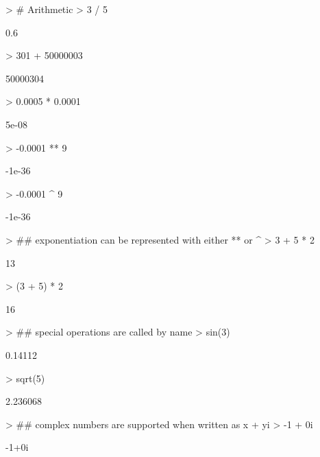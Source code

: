 \documentclass[10pt,letterpaper]{article}
\newenvironment{Schunk}{}{}
\begin{document}
\begin{Schunk}
\begin{Sinput}
> # Arithmetic
> 3 / 5
\end{Sinput}
\begin{Soutput}
[1] 0.6
\end{Soutput}
\begin{Sinput}
> 301 + 50000003
\end{Sinput}
\begin{Soutput}
[1] 50000304
\end{Soutput}
\begin{Sinput}
> 0.0005 * 0.0001
\end{Sinput}
\begin{Soutput}
[1] 5e-08
\end{Soutput}
\begin{Sinput}
> -0.0001 ** 9
\end{Sinput}
\begin{Soutput}
[1] -1e-36
\end{Soutput}
\begin{Sinput}
> -0.0001 ^ 9
\end{Sinput}
\begin{Soutput}
[1] -1e-36
\end{Soutput}
\begin{Sinput}
> ## exponentiation can be represented with either ** or ^
> 3 + 5 * 2
\end{Sinput}
\begin{Soutput}
[1] 13
\end{Soutput}
\begin{Sinput}
> (3 + 5) * 2
\end{Sinput}
\begin{Soutput}
[1] 16
\end{Soutput}
\begin{Sinput}
> ## special operations are called by name
> sin(3)
\end{Sinput}
\begin{Soutput}
[1] 0.14112
\end{Soutput}
\begin{Sinput}
> sqrt(5)
\end{Sinput}
\begin{Soutput}
[1] 2.236068
\end{Soutput}
\begin{Sinput}
> ## complex numbers are supported when written as x + yi
> -1 + 0i
\end{Sinput}
\begin{Soutput}
[1] -1+0i
\end{Soutput}

\end{Schunk}
\end{document}
